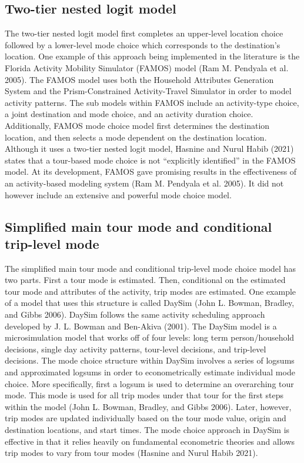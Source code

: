 \documentclass[12pt, oneside, openright]{byuthesis}
\begin{document}
\hypertarget{lit32}{%
\subsection{Two-tier nested logit model}\label{lit32}}

The two-tier nested logit model first completes an upper-level location choice followed by a lower-level mode choice which corresponds to the destination's location. One example of this approach being implemented in the literature is the Florida Activity Mobility Simulator (FAMOS) model (Ram M. Pendyala et al. 2005). The FAMOS model uses both the Household Attributes Generation System and the Prism-Constrained Activity-Travel Simulator in order to model activity patterns. The sub models within FAMOS include an activity-type choice, a joint destination and mode choice, and an activity duration choice. Additionally, FAMOS mode choice model first determines the destination location, and then selects a mode dependent on the destination location. Although it uses a two-tier nested logit model, Hasnine and Nurul Habib (2021) states that a tour-based mode choice is not ``explicitly identified'' in the FAMOS model. At its development, FAMOS gave promising results in the effectiveness of an activity-based modeling system (Ram M. Pendyala et al. 2005). It did not however include an extensive and powerful mode choice model.

\hypertarget{lit33}{%
\subsection{Simplified main tour mode and conditional trip-level mode}\label{lit33}}

The simplified main tour mode and conditional trip-level mode choice model has two parts. First a tour mode is estimated. Then, conditional on the estimated tour mode and attributes of the activity, trip modes are estimated. One example of a model that uses this structure is called DaySim (John L. Bowman, Bradley, and Gibbs 2006). DaySim follows the same activity scheduling approach developed by J. L. Bowman and Ben-Akiva (2001). The DaySim model is a microsimulation model that works off of four levels: long term person/household decisions, single day activity patterns, tour-level decisions, and trip-level decisions. The mode choice structure within DaySim involves a series of logsums and approximated logsums in order to econometrically estimate individual mode choice. More specifically, first a logsum is used to determine an overarching tour mode. This mode is used for all trip modes under that tour for the first steps within the model (John L. Bowman, Bradley, and Gibbs 2006). Later, however, trip modes are updated individually based on the tour mode value, origin and destination locations, and start times. The mode choice approach in DaySim is effective in that it relies heavily on fundamental econometric theories and allows trip modes to vary from tour modes (Hasnine and Nurul Habib 2021).
\end{document}
